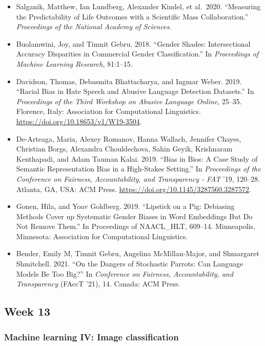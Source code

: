 \documentclass[
  10pt,
]{article}
\providecommand{\tightlist}{%
  \setlength{\itemsep}{0pt}\setlength{\parskip}{0pt}}
\begin{document}
\begin{itemize}
\tightlist
\item
  Salganik, Matthew, Ian Lundberg, Alexander Kindel, et al.~2020.
  ``Measuring the Predictability of Life Outcomes with a Scientiﬁc Mass
  Collaboration.'' \emph{Proceedings of the National Academy of
  Sciences}.
\item
  Buolamwini, Joy, and Timnit Gebru. 2018. ``Gender Shades:
  Intersectional Accuracy Disparities in Commercial Gender
  Classiﬁcation.'' In \emph{Proceedings of Machine Learning Research},
  81:1--15.
\item
  Davidson, Thomas, Debasmita Bhattacharya, and Ingmar Weber. 2019.
  ``Racial Bias in Hate Speech and Abusive Language Detection
  Datasets.'' In \emph{Proceedings of the Third Workshop on Abusive
  Language Online}, 25--35. Florence, Italy: Association for
  Computational Linguistics. \url{https://doi.org/10.18653/v1/W19-3504}.
\item
  De-Arteaga, Maria, Alexey Romanov, Hanna Wallach, Jennifer Chayes,
  Christian Borgs, Alexandra Chouldechova, Sahin Geyik, Krishnaram
  Kenthapadi, and Adam Tauman Kalai. 2019. ``Bias in Bios: A Case Study
  of Semantic Representation Bias in a High-Stakes Setting.'' In
  \emph{Proceedings of the Conference on Fairness, Accountability, and
  Transparency - FAT} '19, 120--28. Atlanta, GA, USA: ACM Press.
  \url{https://doi.org/10.1145/3287560.3287572}.
\item
  Gonen, Hila, and Yoav Goldberg. 2019. ``Lipstick on a Pig: Debiasing
  Methods Cover up Systematic Gender Biases in Word Embeddings But Do
  Not Remove Them.'' In Proceedings of NAACL\_HLT, 609--14. Minneapolis,
  Minnesota: Association for Computational Linguistics.
\item
  Bender, Emily M, Timnit Gebru, Angelina McMillan-Major, and Shmargaret
  Shmitchell. 2021. ``On the Dangers of Stochastic Parrots: Can Language
  Models Be Too Big?'' In \emph{Conference on Fairness, Accountability,
  and Transparency} (FAccT '21), 14. Canada: ACM Press.
\end{itemize}

\hypertarget{week-13}{%
\subsection{Week 13}\label{week-13}}

\hypertarget{machine-learning-iv-image-classification}{%
\subsubsection{Machine learning IV: Image
classification}\label{machine-learning-iv-image-classification}}
\end{document}
